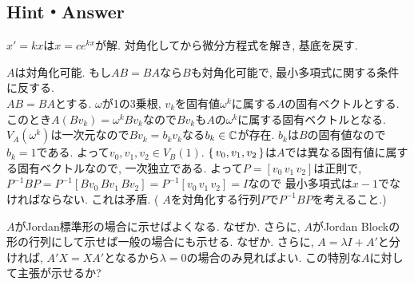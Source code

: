 \subsection{Hint・Answer}
{\small
\begin{probans}
$x' = kx$は$x=ce^{kx}$が解. 対角化してから微分方程式を解き, 基底を戻す.
\end{probans}

\begin{probans}
$A$は対角化可能. もし$AB=BA$なら$B$も対角化可能で, 最小多項式に関する条件に反する.\\
 $AB=BA$とする. $\omega$が1の3乗根, $v_k$を固有値$\omega^k $に属する$A$の固有ベクトルとする. このとき$A(Bv_k) = \omega^k Bv_k$なので$Bv_k$も$A$の$\omega^k$に属する固有ベクトルとなる. $V_A(\omega^k)$は一次元なので$Bv_k = b_kv_k$なる$b_k \in \mathbb{C}$が存在. $b_k$は$B$の固有値なので$b_k=1$である. よって$v_0,v_1,v_2\in V_B(1)$. $\set{v_0,v_1,v_2}$は$A$では異なる固有値に属する固有ベクトルなので, 一次独立である. よって$P=[v_0 \, v_1\, v_2]$は正則で, $P^{-1}BP = P^{-1}[Bv_0\, Bv_1\, Bv_2] = P^{-1}[v_0\, v_1\, v_2] = I$なので 最小多項式は$x-1$でなければならない. これは矛盾. ( $A$を対角化する行列$P$で$P^{-1}BP$を考えること.)
\end{probans}


\begin{probans}
$A$がJordan標準形の場合に示せばよくなる. なぜか. さらに, $A$がJordan Blockの形の行列にして示せば一般の場合にも示せる. なぜか. さらに, $A=\lambda I + A'$と分ければ, $A'X = XA'$となるから$\lambda = 0$の場合のみ見ればよい. この特別な$A$に対して主張が示せるか?
\end{probans}



\begin{probans}
\end{probans}

\begin{probans}
\end{probans}

\begin{probans}
\end{probans}



}
